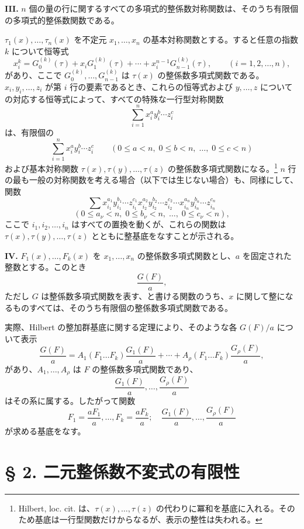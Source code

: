 \documentclass[11pt]{article}
\begin{document}
\textbf{III.} \(n\) 個の量の行に関するすべての多項式的整係数対称関数は、そのうち有限個の多項式的整係数関数である。

\(\tau_1(x),\ldots,\tau_n(x)\) を不定元 \(x_1,\ldots,x_n\) の基本対称関数とする。すると任意の指数 \(k\) について恒等式
\[
        x_i^k = G_0^{(k)}(\tau)+x_iG_1^{(k)}(\tau)+\cdots+x_i^{n-1}G_{n-1}^{(k)}(\tau),
        \qquad (i=1,2,\ldots,n),
\]
があり、ここで \(G_0^{(k)},\ldots,G_{n-1}^{(k)}\) は \(\tau(x)\) の整係数多項式関数である。\(x_i,y_i,\ldots,z_i\) が第 \(i\) 行の要素であるとき、これらの恒等式および \(y,\ldots,z\) についての対応する恒等式によって、すべての特殊な一行型対称関数
\[
        \sum_{i=1}^n x_i^{a}y_i^{b}\cdots z_i^{c}
\]
は、有限個の
\[
        \sum_{i=1}^n x_i^{a}y_i^{b}\cdots z_i^{c}
        \qquad
        (0\le a<n,\;0\le b<n,\;\ldots,\;0\le c<n)
\]
および基本対称関数 \(\tau(x),\tau(y),\ldots,\tau(z)\) の整係数多項式関数になる。\footnote{Hilbert, loc. cit. は、\(\tau(x),\ldots,\tau(z)\) の代わりに冪和を基底に入れる。そのため基底は一行型関数だけからなるが、表示の整性は失われる。}
\(n\) 行の最も一般の対称関数を考える場合（以下では生じない場合）も、同様にして、関数
\[
        \sum x_{i_1}^{a_1}y_{i_1}^{b_1}\cdots z_{i_1}^{c_1}
              x_{i_2}^{a_2}y_{i_2}^{b_2}\cdots z_{i_2}^{c_2}
              \cdots
              x_{i_n}^{a_n}y_{i_n}^{b_n}\cdots z_{i_n}^{c_n}
\]
\[
        (0\le a_\nu<n,\;0\le b_\nu<n,\;\ldots,\;0\le c_\nu<n),
\]
ここで \(i_1,i_2,\ldots,i_n\) はすべての置換を動くが、これらの関数は \(\tau(x),\tau(y),\ldots,\tau(z)\) とともに整基底をなすことが示される。

\textbf{IV.} \(F_1(x),\ldots,F_k(x)\) を \(x_1,\ldots,x_n\) の整係数多項式関数とし、\(a\) を固定された整数とする。このとき
\[
        \frac{G(F)}{a},
\]
ただし \(G\) は整係数多項式関数を表す、と書ける関数のうち、\(x\) に関して整になるものすべては、そのうち有限個の整係数多項式関数である。

実際、Hilbert の整加群基底に関する定理により、そのような各 \(G(F)/a\) について表示
\[
 \frac{G(F)}{a}
 =
 A_1(F_1\ldots F_k)\frac{G_1(F)}{a}
 +\cdots+
 A_\rho(F_1\ldots F_k)\frac{G_\rho(F)}{a},
\]
があり、\(A_1,\ldots,A_\rho\) は \(F\) の整係数多項式関数であり、
\[
        \frac{G_1(F)}{a},\ldots,\frac{G_\rho(F)}{a}
\]
はその系に属する。したがって関数
\[
        F_1=\frac{aF_1}{a},\ldots,F_k=\frac{aF_k}{a};
        \quad
        \frac{G_1(F)}{a},\ldots,\frac{G_\rho(F)}{a}
\]
が求める基底をなす。

\setcounter{equation}{0}
\section*{§ 2. 二元整係数不変式の有限性}
\end{document}
